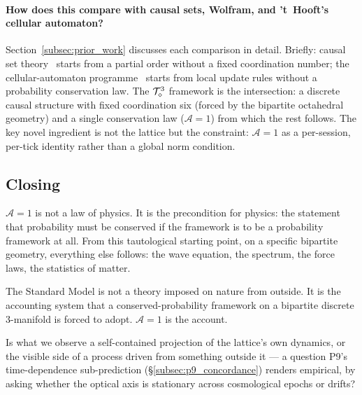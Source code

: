 \paragraph{How does this compare with causal sets, Wolfram, and
't~Hooft's cellular automaton?}
Section~\ref{subsec:prior_work} discusses each comparison in detail.
Briefly: causal set theory~\cite{bombelli1987} starts from a partial
order without a fixed coordination number;
the cellular-automaton programme~\cite{thooft2016, wolfram2002,
zuse1969} starts from local update rules without a probability
conservation law.
The $\mathcal{T}_\diamond^3$ framework is the intersection: a discrete causal
structure with fixed coordination six (forced by the bipartite
octahedral geometry) and a single conservation law ($\mathcal{A}=1$)
from which the rest follows.
The key novel ingredient is not the lattice but the constraint:
$\mathcal{A}=1$ as a per-session, per-tick identity rather than a
global norm condition.

\subsection*{Closing}

$\mathcal{A}=1$ is not a law of physics.
It is the precondition for physics: the statement that probability
must be conserved if the framework is to be a probability framework
at all.
From this tautological starting point, on a specific bipartite
geometry, everything else follows: the wave equation, the spectrum,
the force laws, the statistics of matter.

The Standard Model is not a theory imposed on nature from outside.
It is the accounting system that a conserved-probability framework
on a bipartite discrete 3-manifold is forced to adopt.
$\mathcal{A}=1$ is the account.

Is what we observe a self-contained projection of the lattice's own
dynamics, or the visible side of a process driven from something
outside it --- a question P9's time-dependence sub-prediction
(\S\ref{subsec:p9_concordance}) renders empirical, by asking whether
the optical axis is stationary across cosmological epochs or drifts?

